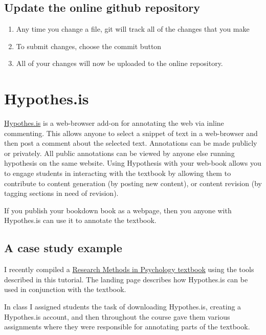 \documentclass[]{book}
\providecommand{\tightlist}{%
  \setlength{\itemsep}{0pt}\setlength{\parskip}{0pt}}
\theoremstyle{definition}
\theoremstyle{definition}
\theoremstyle{definition}
\theoremstyle{remark}
\begin{document}
\section{Update the online github
repository}\label{update-the-online-github-repository}

\begin{enumerate}
\def\labelenumi{\arabic{enumi}.}
\tightlist
\item
  Any time you change a file, git will track all of the changes that you
  make
\item
  To submit changes, choose the commit button
\item
  All of your changes will now be uploaded to the online repository.
\end{enumerate}

\chapter{Hypothes.is}\label{hypothes.is-1}

\href{https://web.hypothes.is}{Hypothes.is} is a web-browser add-on for
annotating the web via inline commenting. This allows anyone to select a
snippet of text in a web-browser and then post a comment about the
selected text. Annotations can be made publicly or privately. All public
annotations can be viewed by anyone else running hypothesis on the same
website. Using Hypothesis with your web-book allows you to engage
students in interacting with the textbook by allowing them to contribute
to content generation (by posting new content), or content revision (by
tagging sections in need of revision).

If you publish your bookdown book as a webpage, then you anyone with
Hypothes.is can use it to annotate the textbook.

\section{A case study example}\label{a-case-study-example}

I recently compiled a
\href{http://crumplab.github.io/ResearchMethods/}{Research Methods in
Psychology textbook} using the tools described in this tutorial. The
landing page describes how Hypothes.is can be used in conjunction with
the textbook.

In class I assigned students the task of downloading Hypothes.is,
creating a Hypothes.is account, and then throughout the course gave them
various assignments where they were responsible for annotating parts of
the textbook.
\end{document}
